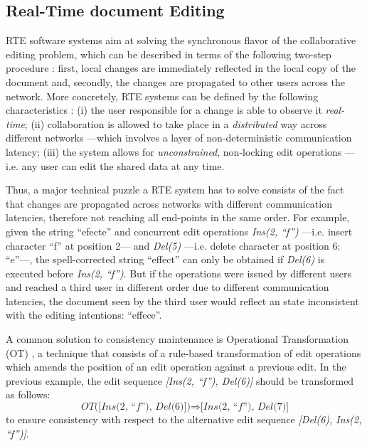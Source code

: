 \documentclass{sig-alternate}
\begin{document}
\subsection{Real-Time document Editing}\label{subsec:rte}
RTE software systems aim at solving the synchronous flavor of the collaborative editing
problem, which can be described in terms of the following two-step procedure \cite{Imine2009}:
first, local changes are immediately reflected in the local copy of the document and, secondly,
the changes are propagated to other users across the network.
More concretely, RTE systems can be defined by the following characteristics \cite{Sun1998}:
(i) the user responsible for a change is able to observe it \textit{real-time};
(ii) collaboration is allowed to take place in a \textit{distributed} way across
different networks ---which involves a layer of non-deterministic communication
latency; (iii) the system allows for \textit{unconstrained}, non-locking edit operations ---i.e.
any user can edit the shared data at any time.

Thus, a major technical puzzle a RTE system has to solve consists of the fact that changes
are propagated across networks with different communication latencies, therefore not
reaching all end-points in the same order. For example, given
the string ``efecte'' and concurrent edit operations \textit{Ins(2, ``f'')} ---i.e.
insert character ``f'' at position 2--- and \textit{Del(5)} ---i.e.
delete character at position 6: ``e''---, the spell-corrected string ``effect''
can only be obtained if \textit{Del(6)} is executed before \textit{Ins(2, ``f'')}.
But if the operations were issued by different users and reached a third user in different
order due to different communication latencies,
the document seen by the third user would reflect an state inconsistent with
the editing intentions: ``effece''.

A common solution to consistency maintenance is Operational Transformation
(OT) \cite{SuClarence}, a technique that consists of a rule-based transformation
of edit operations which amends the position of an edit operation against a previous edit.
In the previous example, the edit sequence \textit{[Ins(2, ``f''), Del(6)]} should be
transformed as follows:
\begin{equation*}
  \textit{OT([Ins(2, ``f''), Del(6)])} \Rightarrow \textit{[Ins(2, ``f''), Del(7)]}
\end{equation*}
to ensure consistency with respect to the alternative edit sequence
\textit{[Del(6), Ins(2, ``f'')]}.
\end{document}
